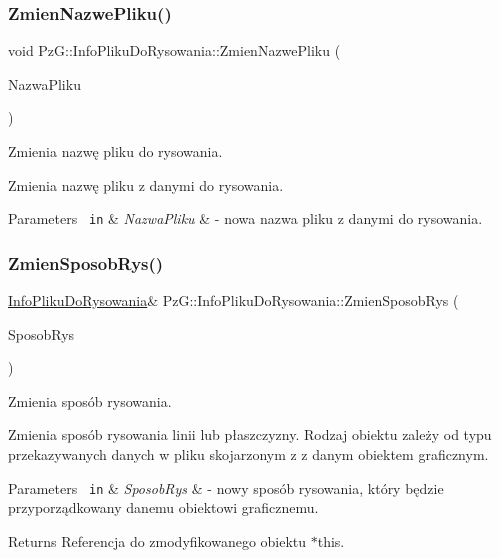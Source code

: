 \subsubsection{\texorpdfstring{ZmienNazwePliku()}{ZmienNazwePliku()}}
{\footnotesize\ttfamily void Pz\+G\+::\+Info\+Pliku\+Do\+Rysowania\+::\+Zmien\+Nazwe\+Pliku (\begin{DoxyParamCaption}\item[{const std\+::string \&}]{Nazwa\+Pliku }\end{DoxyParamCaption})\hspace{0.3cm}{\ttfamily [inline]}}



Zmienia nazwę pliku do rysowania. 

Zmienia nazwę pliku z danymi do rysowania. 
\begin{DoxyParams}[1]{Parameters}
\mbox{\texttt{ in}}  & {\em Nazwa\+Pliku} & -\/ nowa nazwa pliku z danymi do rysowania. \\
\hline
\end{DoxyParams}
\mbox{\label{class_pz_g_1_1_info_pliku_do_rysowania_a4245bff195e0d6d382ed7d776b5ad645}} 
\subsubsection{\texorpdfstring{ZmienSposobRys()}{ZmienSposobRys()}}
{\footnotesize\ttfamily \mbox{\hyperlink{class_pz_g_1_1_info_pliku_do_rysowania}{Info\+Pliku\+Do\+Rysowania}}\& Pz\+G\+::\+Info\+Pliku\+Do\+Rysowania\+::\+Zmien\+Sposob\+Rys (\begin{DoxyParamCaption}\item[{\mbox{\hyperlink{namespace_pz_g_a53d89f50686ddd39301f9706cc1247dc}{Typ\+Sposobu\+Rysowania}}}]{Sposob\+Rys }\end{DoxyParamCaption})\hspace{0.3cm}{\ttfamily [inline]}}



Zmienia sposób rysowania. 

Zmienia sposób rysowania linii lub płaszczyzny. Rodzaj obiektu zależy od typu przekazywanych danych w pliku skojarzonym z z danym obiektem graficznym. 
\begin{DoxyParams}[1]{Parameters}
\mbox{\texttt{ in}}  & {\em Sposob\+Rys} & -\/ nowy sposób rysowania, który będzie przyporządkowany danemu obiektowi graficznemu. \\
\hline
\end{DoxyParams}
\begin{DoxyReturn}{Returns}
Referencja do zmodyfikowanego obiektu {\ttfamily $\ast$this}. 
\end{DoxyReturn}
\mbox{\label{class_pz_g_1_1_info_pliku_do_rysowania_a2a7e9e212905112c6f236fe1d0a1f2ec}} 
